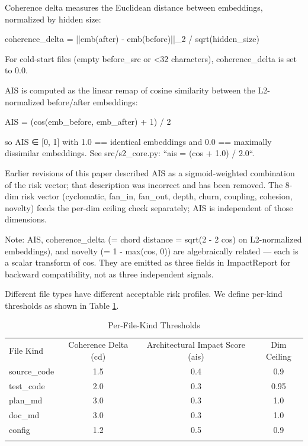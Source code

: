 
Coherence delta measures the Euclidean distance between embeddings, normalized by hidden size:

coherence_delta = ||emb(after) - emb(before)||_2 / sqrt(hidden_size)

For cold-start files (empty before_src or <32 characters), coherence_delta is set to 0.0.


AIS is computed as the linear remap of cosine similarity between the
L2-normalized before/after embeddings:

  AIS = (cos(emb_before, emb_after) + 1) / 2

so AIS ∈ [0, 1] with 1.0 == identical embeddings and 0.0 == maximally
dissimilar embeddings. See src/s2_core.py: ``ais = (cos + 1.0) / 2.0``.

Earlier revisions of this paper described AIS as a sigmoid-weighted
combination of the risk vector; that description was incorrect and has
been removed. The 8-dim risk vector (cyclomatic, fan_in, fan_out,
depth, churn, coupling, cohesion, novelty) feeds the per-dim ceiling
check separately; AIS is independent of those dimensions.

Note: AIS, coherence_delta (= chord distance = sqrt(2 - 2 cos) on
L2-normalized embeddings), and novelty (= 1 - max(cos, 0)) are
algebraically related — each is a scalar transform of cos. They are
emitted as three fields in ImpactReport for backward compatibility,
not as three independent signals.


Different file types have different acceptable risk profiles. We define per-kind thresholds as shown in Table \ref{tab:thresholds}.

\begin{table}[t]
    \centering
    \caption{Per-File-Kind Thresholds}
    \label{tab:thresholds}
    \begin{tabular}{lccc}
        \toprule
        File Kind & Coherence Delta (cd) & Architectural Impact Score (ais) & Dim Ceiling \\\n        \midrule
        source_code & 1.5 & 0.4 & 0.9 \\\n        test_code & 2.0 & 0.3 & 0.95 \\\n        plan_md & 3.0 & 0.3 & 1.0 \\\n        doc_md & 3.0 & 0.3 & 1.0 \\\n        config & 1.2 & 0.5 & 0.9 \\\n        \bottomrule
    \end{tabular}
\end{table}

